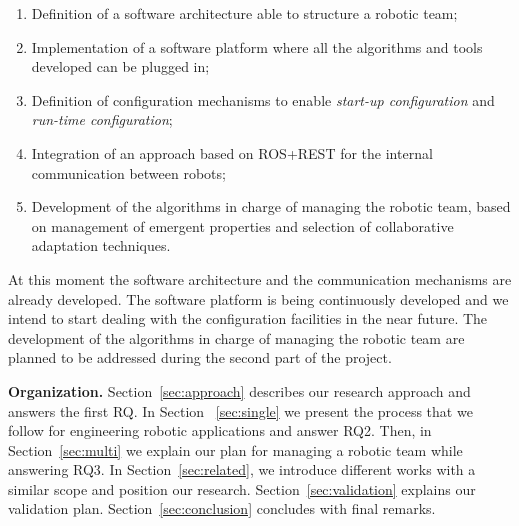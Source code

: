 \begin{enumerate}
\item Definition of a software architecture able to structure a robotic team;
\item Implementation of a software platform where all the algorithms and tools developed can be plugged in;
\item Definition of configuration mechanisms to enable \emph{start-up configuration} and \emph{run-time configuration};
\item Integration of an approach based on ROS+REST for the internal communication between robots;
\item Development of the algorithms in charge of managing the robotic team, based on management of emergent properties and selection of collaborative adaptation techniques.
\end{enumerate}

At this moment the software architecture and the communication mechanisms are already developed.
The software platform is being continuously developed and we intend to start dealing with the configuration facilities in the near future.
The development of the algorithms in charge of managing the robotic team are planned to be addressed during the second part of the project.

\textbf{Organization.} 
Section~\ref{sec:approach} describes our research approach and answers the first RQ. %
In Section ~\ref{sec:single} we present the process that we follow for engineering robotic applications and answer RQ2.
Then, in Section~\ref{sec:multi} we explain our plan for managing a robotic team while answering RQ3.
In Section~\ref{sec:related}, we introduce different works with a similar scope and position our research.
Section~\ref{sec:validation} explains our validation plan.
Section~\ref{sec:conclusion} concludes with final remarks.